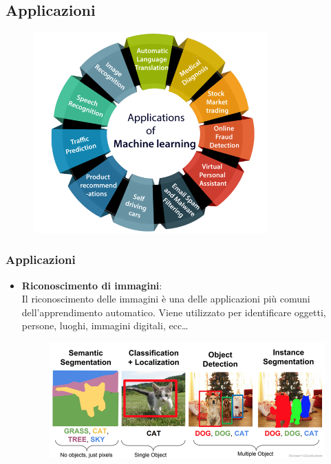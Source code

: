 \subsection[Applicazioni]{Applicazioni}
\begin{frame}
	
	\begin{figure}[!htbp]
		\centering
		\includegraphics[width=9.0cm]{images/intro/ml_applications.png}
	\end{figure}

\end{frame}


\begin{frame}
	
	\frametitle{Applicazioni}
		\begin{itemize}
			\item \textbf{Riconoscimento di immagini}:\\
				Il riconoscimento delle immagini è una delle applicazioni più comuni dell'apprendimento automatico. Viene utilizzato per identificare oggetti, persone, luoghi, immagini digitali, ecc\dots
			\begin{figure}[!htbp]
				\centering
				\includegraphics[width=11.0cm]{images/intro/ml_image_recognition.png}
			\end{figure}
			
		\end{itemize}		

\end{frame}

